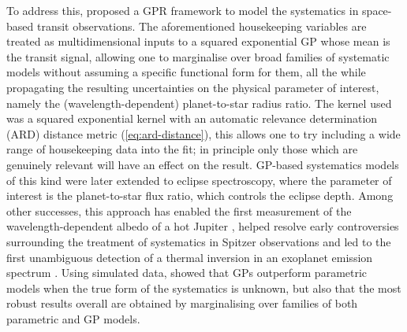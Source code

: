\documentclass[letterpaper]{ar-1col}
\begin{document}
To address this, \citet{2012MNRAS.419.2683G} proposed a GPR framework to model the systematics in space-based transit observations. The aforementioned housekeeping variables are treated as multidimensional inputs to a squared exponential GP whose mean is the transit signal, allowing one to marginalise over broad families of systematic models without assuming a specific functional form for them, all the while propagating the resulting uncertainties on the physical parameter of interest, namely the (wavelength-dependent) planet-to-star radius ratio. The kernel used was a squared exponential kernel with an automatic relevance determination (ARD) distance metric (\autoref{eq:ard-distance}), this allows one to try including a wide range of housekeeping data into the fit; in principle only those which are genuinely relevant will have an effect on the result.
GP-based systematics models of this kind were later extended to eclipse spectroscopy, where the parameter of interest is the planet-to-star flux ratio, which controls the eclipse depth. Among other successes, this approach has enabled the first measurement of the wavelength-dependent albedo of a hot Jupiter \citep{2013ApJ...772L..16E}, helped resolve early controversies surrounding the treatment of systematics in Spitzer observations \citep{2015MNRAS.451..680E} and
led to the first unambiguous detection of a thermal inversion in an exoplanet emission spectrum \citep{2017Natur.548...58E}. Using simulated data, \citet{2014MNRAS.445.3401G} showed that GPs outperform parametric models when the true form of the systematics is unknown, but also that the most robust results overall are obtained by marginalising over families of both parametric and GP models.
\end{document}

